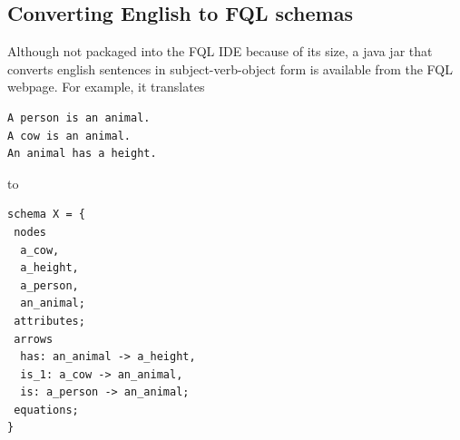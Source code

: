 \documentclass[12pt]{article}
\begin{document}
\subsection{Converting English to FQL schemas}

Although not packaged into the FQL IDE because of its size, a java jar that converts english sentences in subject-verb-object form is available from the FQL webpage.   For example, it translates
\begin{verbatim}
A person is an animal.
A cow is an animal.
An animal has a height.
\end{verbatim}
to
\begin{verbatim}
schema X = {
 nodes
  a_cow,
  a_height,
  a_person,
  an_animal;
 attributes;
 arrows
  has: an_animal -> a_height,
  is_1: a_cow -> an_animal,
  is: a_person -> an_animal;
 equations;
}
\end{verbatim}





\end{document}
